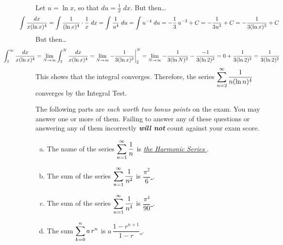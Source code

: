\documentclass[12pt,letterpaper]{exam}
\begin{document}
\begin{questions}
{Let $u= \ln x$, so that $du= \frac{1}{x} \;dx$. But then\dots
	\[
	\hspace{-1cm} \int \dfrac{dx}{x (\ln x)^4}= \int \dfrac{1}{(\ln x)^4} \cdot \dfrac{1}{x} \;dx= \int \dfrac{1}{u^4} \;du= \int u^{-4} \;du= -\frac{1}{3} \, u^{-3} + C= -\dfrac{1}{3u^3} + C= -\dfrac{1}{3(\ln x)^3} + C
	\]
But then\dots
	\[
	\hspace{-2cm} \int_2^\infty \dfrac{dx}{x (\ln x)^4}= \lim_{N \to \infty} \int_2^N \dfrac{dx}{x (\ln x)^4}= \lim_{N \to \infty} -\dfrac{1}{3(\ln x)^3} \bigg|_2^N= \lim_{N \to \infty} -\dfrac{1}{3(\ln N)^3} - \dfrac{-1}{3 (\ln 2)^3}= 0 + \dfrac{1}{3 (\ln 2)^3}= \dfrac{1}{3 (\ln 2)^3}
	\]
This shows that the integral converges. Therefore, the series $\displaystyle\sum_{n=2}^\infty \dfrac{1}{n (\ln n)^4}$ converges by the Integral Test.}



\newpage
{} The following parts are \textit{each worth two bonus points} on the exam. You may answer one or more of them. Failing to answer any of these questions or answering any of them incorrectly \textit{\bfseries will not} count against your exam score. \par\vspace{0.5cm}
	\begin{enumerate}[(a)]
	\item The name of the series $\displaystyle\sum_{n=1}^\infty \dfrac{1}{n}$ is \underline{\hspace{2cm} \itshape the Harmonic Series \hspace{2cm}}. \par\vspace{0.1cm}
	
	\item The sum of the series $\displaystyle\sum_{n=1}^\infty \dfrac{1}{n^2}$ is \underline{\hspace{2cm} $\dfrac{\pi^2}{6}$ \hspace{2cm}}. \par\vspace{0.1cm}
	
	\item The sum of the series $\displaystyle\sum_{n=1}^\infty \dfrac{1}{n^4}$ is \underline{\hspace{2cm} $\dfrac{\pi^4}{90}$ \hspace{2cm}}. \par\vspace{0.1cm}
	
	\item The sum $\displaystyle\sum_{k=0}^n a\, r^n$ is \underline{\hspace{2cm} $a \, \dfrac{1 - r^{n+1}}{1 - r}$ \hspace{2cm}}. \par\vspace{0.1cm}
	

\end{enumerate}
\end{questions}
\end{document}
